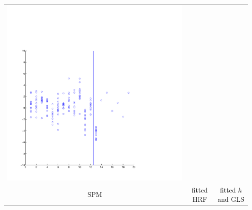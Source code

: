 \documentclass{beamer}
\begin{document}
\begin{frame}
\begin{tabular}{ccc}
\includegraphics[scale=0.15]{ex2_data2.pdf}\\
SPM & fitted HRF & fitted $h$ and GLS
\end{tabular}
\end{frame}
\end{document}
